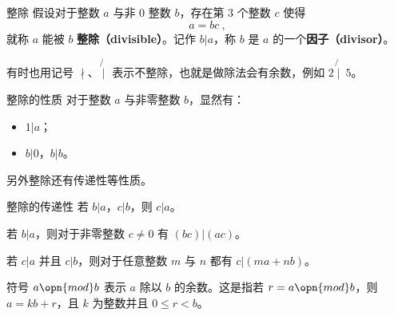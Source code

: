 
\begin{definition}{整除}
假设对于整数 $a$ 与非 $0$ 整数 $b$，存在第 $3$ 个整数 $c$ 使得
\begin{equation}
a = bc ~,
\end{equation}
就称 $a$ 能被 $b$ \textbf{整除（divisible）}。记作 $b | a$，称 $b$ 是 $a$ 的一个\textbf{因子（divisor）}。
\end{definition}

有时也用记号 $\nmid$、$\not{\mid}$ 表示不整除，也就是做除法会有余数，例如 $2 \not{\mid}~ 5 $。

\begin{corollary}{整除的性质}
对于整数 $a$ 与非零整数 $b$，显然有：
\begin{itemize}
\item $1 | a$；
\item $b | 0$，$b | b$。
\end{itemize}
\end{corollary}

另外整除还有传递性等性质。
\begin{theorem}{整除的传递性}
若 $b|a$，$c|b$，则 $c|a$。
\end{theorem}
\begin{theorem}{}
若 $b|a$，则对于非零整数 $c \neq 0$ 有 $(bc) | (ac)$。
\end{theorem}
\begin{theorem}{}
若 $c|a$ 并且 $c|b$，则对于任意整数 $m$ 与 $n$ 都有 $c | (ma + nb)$。
\end{theorem}

\begin{definition}{}
符号 $a \opn{mod} b$ 表示 $a$ 除以 $b$ 的余数。这是指若 $r = a \opn{mod} b$，则 $a = kb + r$，且 $k$ 为整数并且 $0 \le r < b$。
\end{definition}
